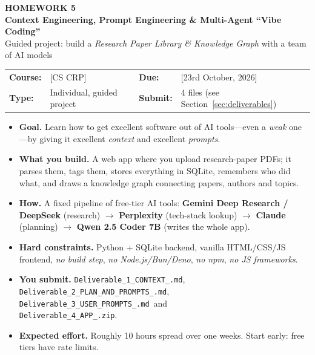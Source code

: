\documentclass[11pt,a4paper]{article}
\newcommand{\uid}{[HeUserID]}
\newcommand{\coursename}{[CS CRP]}
\newcommand{\duedate}{[23rd October, 2026]}
\newcommand{\dA}{\texttt{Deliverable\_1\_\allowbreak CONTEXT\_\allowbreak\uid.md}}
\newcommand{\dB}{\texttt{Deliverable\_2\_\allowbreak PLAN\_AND\_PROMPTS\_\allowbreak\uid.md}}
\newcommand{\dC}{\texttt{Deliverable\_3\_\allowbreak USER\_PROMPTS\_\allowbreak\uid.md}}
\newcommand{\dD}{\texttt{Deliverable\_4\_\allowbreak APP\_\allowbreak\uid.zip}}
\begin{document}
\begin{tcolorbox}[enhanced,colback=accent,colframe=accent,coltext=white,arc=3pt,left=10pt,right=10pt,top=10pt,bottom=10pt]
{\Large\bfseries HOMEWORK 5}\\[2pt]
{\huge\bfseries Context Engineering, Prompt Engineering \& Multi-Agent ``Vibe Coding''}\\[6pt]
{\large Guided project: build a \emph{Research Paper Library \& Knowledge Graph} with a team of AI models}
\end{tcolorbox}

\begin{tabularx}{\textwidth}{@{}lXlX@{}}
\textbf{Course:} & \coursename & \textbf{Due:} & \duedate\\
\textbf{Type:} & Individual, guided project & \textbf{Submit:} & 4 files (see Section~\ref{sec:deliverables})\\
\end{tabularx}

\vspace{0.4em}
\begin{tcolorbox}[enhanced,breakable,colback=tipbg,colframe=accent,title=\bfseries Assignment at a glance,fonttitle=\bfseries,boxrule=0.6pt,arc=2pt]
\begin{itemize}
\item \textbf{Goal.} Learn how to get excellent software out of AI tools---even a \emph{weak} one---by giving it excellent \emph{context} and excellent \emph{prompts}.
\item \textbf{What you build.} A web app where you upload research-paper PDFs; it parses them, tags them, stores everything in SQLite, remembers who did what, and draws a knowledge graph connecting papers, authors and topics.
\item \textbf{How.} A fixed pipeline of free-tier AI tools: \textbf{Gemini Deep Research / DeepSeek} (research) $\rightarrow$ \textbf{Perplexity} (tech-stack lookup) $\rightarrow$ \textbf{Claude} (planning) $\rightarrow$ \textbf{Qwen 2.5 Coder 7B} (writes the whole app).
\item \textbf{Hard constraints.} Python + SQLite backend, vanilla HTML/CSS/JS frontend, \emph{no build step}, \emph{no Node.js/Bun/Deno}, \emph{no npm}, \emph{no JS frameworks}.
\item \textbf{You submit.} \dA, \\ \dB, \\ \dC\ and \\ \dD.
\item \textbf{Expected effort.} Roughly 10 hours spread over one weeks. Start early: free tiers have rate limits.
\end{itemize}
\end{tcolorbox}
\end{document}
